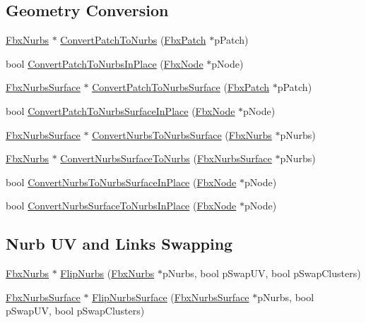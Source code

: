 \subsection*{Geometry Conversion}
\begin{DoxyCompactItemize}
\item 
\hyperlink{class_fbx_nurbs}{Fbx\+Nurbs} $\ast$ \hyperlink{class_fbx_geometry_converter_a3164d027c0c9251642f8e48f6a59f662}{Convert\+Patch\+To\+Nurbs} (\hyperlink{class_fbx_patch}{Fbx\+Patch} $\ast$p\+Patch)
\item 
bool \hyperlink{class_fbx_geometry_converter_acc457be0a21f7566ff8bdd0d9a704b46}{Convert\+Patch\+To\+Nurbs\+In\+Place} (\hyperlink{class_fbx_node}{Fbx\+Node} $\ast$p\+Node)
\item 
\hyperlink{class_fbx_nurbs_surface}{Fbx\+Nurbs\+Surface} $\ast$ \hyperlink{class_fbx_geometry_converter_a8c29f94bf91e84d6ee4e665ed9632e09}{Convert\+Patch\+To\+Nurbs\+Surface} (\hyperlink{class_fbx_patch}{Fbx\+Patch} $\ast$p\+Patch)
\item 
bool \hyperlink{class_fbx_geometry_converter_afd5bc619771c69c680b2da7ae4d0c2e4}{Convert\+Patch\+To\+Nurbs\+Surface\+In\+Place} (\hyperlink{class_fbx_node}{Fbx\+Node} $\ast$p\+Node)
\item 
\hyperlink{class_fbx_nurbs_surface}{Fbx\+Nurbs\+Surface} $\ast$ \hyperlink{class_fbx_geometry_converter_a33fe5cce26020e2687dcd1b1e05109a4}{Convert\+Nurbs\+To\+Nurbs\+Surface} (\hyperlink{class_fbx_nurbs}{Fbx\+Nurbs} $\ast$p\+Nurbs)
\item 
\hyperlink{class_fbx_nurbs}{Fbx\+Nurbs} $\ast$ \hyperlink{class_fbx_geometry_converter_aeccff6de5e2abd1f8625147b5e061b8b}{Convert\+Nurbs\+Surface\+To\+Nurbs} (\hyperlink{class_fbx_nurbs_surface}{Fbx\+Nurbs\+Surface} $\ast$p\+Nurbs)
\item 
bool \hyperlink{class_fbx_geometry_converter_ae8662fd4c468b6e18b276f3ef353fe2f}{Convert\+Nurbs\+To\+Nurbs\+Surface\+In\+Place} (\hyperlink{class_fbx_node}{Fbx\+Node} $\ast$p\+Node)
\item 
bool \hyperlink{class_fbx_geometry_converter_a82c9ea1ab75c8eefd555b4c538f3bbb7}{Convert\+Nurbs\+Surface\+To\+Nurbs\+In\+Place} (\hyperlink{class_fbx_node}{Fbx\+Node} $\ast$p\+Node)
\end{DoxyCompactItemize}
\subsection*{Nurb UV and Links Swapping}
\begin{DoxyCompactItemize}
\item 
\hyperlink{class_fbx_nurbs}{Fbx\+Nurbs} $\ast$ \hyperlink{class_fbx_geometry_converter_a5b6352d91ef28ac20c8b759496064fa3}{Flip\+Nurbs} (\hyperlink{class_fbx_nurbs}{Fbx\+Nurbs} $\ast$p\+Nurbs, bool p\+Swap\+UV, bool p\+Swap\+Clusters)
\item 
\hyperlink{class_fbx_nurbs_surface}{Fbx\+Nurbs\+Surface} $\ast$ \hyperlink{class_fbx_geometry_converter_a1fcc73c0f44390bf3ac13f8a796e34de}{Flip\+Nurbs\+Surface} (\hyperlink{class_fbx_nurbs_surface}{Fbx\+Nurbs\+Surface} $\ast$p\+Nurbs, bool p\+Swap\+UV, bool p\+Swap\+Clusters)
\end{DoxyCompactItemize}
